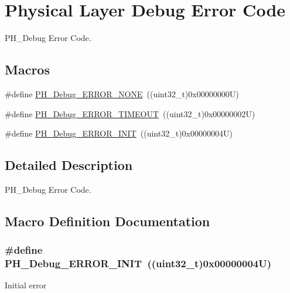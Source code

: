 \hypertarget{group___p_h___debug___error___code}{}\section{Physical Layer Debug Error Code}
\label{group___p_h___debug___error___code}


P\+H\+\_\+\+Debug Error Code.  


\subsection*{Macros}
\begin{DoxyCompactItemize}
\item 
\#define \hyperlink{group___p_h___debug___error___code_ga25e714b84859b15002f51ca15a810102}{P\+H\+\_\+\+Debug\+\_\+\+E\+R\+R\+O\+R\+\_\+\+N\+O\+NE}~((uint32\+\_\+t)0x00000000\+U)
\item 
\#define \hyperlink{group___p_h___debug___error___code_ga2404c547f870b71cff749676950a322f}{P\+H\+\_\+\+Debug\+\_\+\+E\+R\+R\+O\+R\+\_\+\+T\+I\+M\+E\+O\+UT}~((uint32\+\_\+t)0x00000002\+U)
\item 
\#define \hyperlink{group___p_h___debug___error___code_gac985a04f269da40895f2c53afbacb5a3}{P\+H\+\_\+\+Debug\+\_\+\+E\+R\+R\+O\+R\+\_\+\+I\+N\+IT}~((uint32\+\_\+t)0x00000004\+U)
\end{DoxyCompactItemize}


\subsection{Detailed Description}
P\+H\+\_\+\+Debug Error Code. 



\subsection{Macro Definition Documentation}
\subsubsection[{\texorpdfstring{P\+H\+\_\+\+Debug\+\_\+\+E\+R\+R\+O\+R\+\_\+\+I\+N\+IT}{PH_Debug_ERROR_INIT}}]{\setlength{\rightskip}{0pt plus 5cm}\#define P\+H\+\_\+\+Debug\+\_\+\+E\+R\+R\+O\+R\+\_\+\+I\+N\+IT~((uint32\+\_\+t)0x00000004\+U)}\hypertarget{group___p_h___debug___error___code_gac985a04f269da40895f2c53afbacb5a3}{}\label{group___p_h___debug___error___code_gac985a04f269da40895f2c53afbacb5a3}
Initial error 
